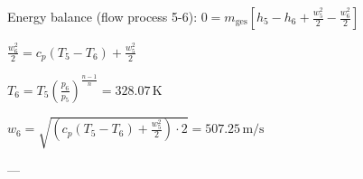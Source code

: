 Energy balance (flow process 5-6):  
\( 0 = m_{\text{ges}} \left[ h_5 - h_6 + \frac{w_5^2}{2} - \frac{w_6^2}{2} \right] \)  

\( \frac{w_6^2}{2} = c_p \left( T_5 - T_6 \right) + \frac{w_5^2}{2} \)  

\( T_6 = T_5 \left( \frac{p_6}{p_5} \right)^{\frac{n-1}{n}} = 328.07 \, \text{K} \)  

\( w_6 = \sqrt{\left( c_p \left( T_5 - T_6 \right) + \frac{w_5^2}{2} \right) \cdot 2} = 507.25 \, \text{m/s} \)  

---